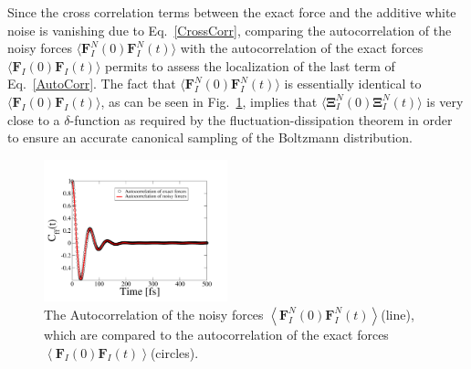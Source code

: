 Since the cross correlation terms between the exact force and the additive white noise is vanishing due to Eq.~\ref{CrossCorr}, comparing the autocorrelation of the noisy forces $\langle \textbf{F}_{I}^{N}(0)\textbf{F}_{I}^{N}(t)\rangle$ with the autocorrelation of the exact forces $\langle \textbf{F}_{I}(0) \textbf{F}_{I}(t)\rangle$ permits to assess the localization of the last term of Eq.~\ref{AutoCorr}.
The fact that $\langle \textbf{F}_{I}^{N}(0)\textbf{F}_{I}^{N}(t)\rangle$ is essentially identical to $\langle \textbf{F}_{I}(0) \textbf{F}_{I}(t)\rangle$, as can be seen in Fig.~\ref{Fig4}, implies that $\langle \mathbf{\Xi } _{I}^{N}(0) \mathbf{\Xi } _{I}^{N}(t)\rangle$ is very close to a $\delta$-function as required by the fluctuation-dissipation theorem in order to ensure an accurate canonical sampling of the Boltzmann distribution. 
\begin{figure}%
\begin{center}
\includegraphics[width=0.475\textwidth]
{figures/AutocorrelationPlot_n.pdf}
\end{center}
\caption{\label{Fig4}
The Autocorrelation of the noisy forces \(
\left \langle \textbf{F}_{I}^{N}\left ( 0 \right ) \textbf{F}_{I}^{N}\left ( t \right )\right \rangle \)(line), which are compared to the autocorrelation of the exact forces \( \left \langle \textbf{F}_{I}\left ( 0 \right ) \textbf{F}_{I}\left ( t \right )\right \rangle \)(circles). 
} \end{figure}

